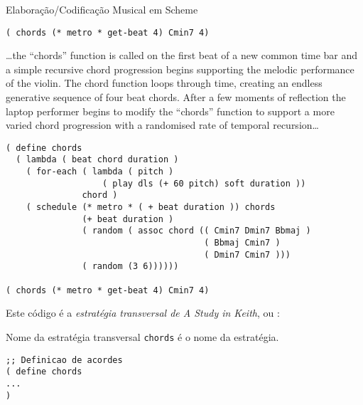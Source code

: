 \begin{example}{Elaboração/Codificação Musical em Scheme}
\begin{verbatim}
( chords (* metro * get-beat 4) Cmin7 4)
\end{verbatim}

\begin{citacao}
{\ldots the “chords” function is called on the first beat of a new common time bar and a simple recursive chord progression begins supporting the melodic performance of the violin. The chord function loops through time, creating an endless generative sequence of four beat chords. After a few moments of reflection the laptop performer begins to modify the “chords” function to support a more varied chord progression with a randomised rate of temporal recursion\ldots}
\end{citacao}

\begin{verbatim}
( define chords
  ( lambda ( beat chord duration )
    ( for-each ( lambda ( pitch )
                   ( play dls (+ 60 pitch) soft duration ))
               chord )
    ( schedule (* metro * ( + beat duration )) chords
               (+ beat duration )
               ( random ( assoc chord (( Cmin7 Dmin7 Bbmaj )
                                       ( Bbmaj Cmin7 )
                                       ( Dmin7 Cmin7 )))
               ( random (3 6))))))
               
( chords (* metro * get-beat 4) Cmin7 4)
\end{verbatim}
\end{example}

Este código é a \emph{estratégia transversal de A Study in Keith}, ou :

\begin{example}{Nome da estratégia transversal}
\verb|chords| é o nome da estratégia.

\begin{verbatim}
;; Definicao de acordes
( define chords
...
)
\end{verbatim}
\end{example}

